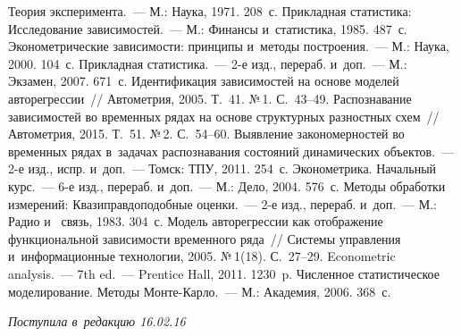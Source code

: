 \begin{multicols}{2}
{\small\frenchspacing
 {%
 \begin{thebibliography}{99}
 Теория эксперимента.~---  М.: Наука, 1971. 208~с.
 Прикладная статистика: 
Исследование зависимостей.~--- М.: Финансы и~статистика, 1985. 487~с.
 Эконометрические зависимости: принципы 
и~методы построения.~--- М.: Наука, 2000. 104~с.
 Прикладная статистика.~--- 2-е изд., перераб. и~доп.~--- М.: 
Экзамен, 2007. 671~с.
 Идентификация зависимостей на основе моделей 
авторегрессии~// Автометрия, 2005. Т.~41. №\,1. С.~43--49.
 Распознавание зависимостей во 
временных рядах на основе структурных разностных схем~// Автометрия, 2015. 
Т.~51. №\,2. С.~54--60.
 Выявление 
закономерностей во временных рядах в~задачах распознавания состояний 
динамических объектов.~--- 2-е изд., испр. и~доп.~--- Томск: ТПУ, 2011. 254~с.
 Эконометрика. 
Начальный курс.~--- 6-е изд., перераб. и~доп.~--- М.: Дело, 2004. 576~с.
 Методы обработки измерений: 
Квазиправдоподобные оценки.~--- 2-е изд., перераб. и~доп.~--- М.: Радио и~
связь, 1983. 304~с.
 Модель авторегрессии как отображение функциональной 
зависимости временного ряда~// Системы управления и~информационные 
технологии, 2005. №\,1(18). С.~27--29.
 Econometric analysis.~--- 7th ed.~--- Prentice Hall, 2011. 
1230~p.
 Численное статистическое 
моделирование. Методы Мон\-те-Кар\-ло.~--- М.: Академия, 2006. 368~с.

\end{thebibliography}

 }
 }

\end{multicols}

\vspace*{-3pt}

\hfill{\small\textit{Поступила в~редакцию 16.02.16}}


\newpage

